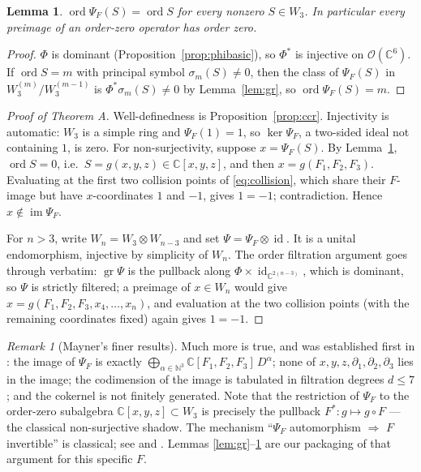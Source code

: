 \documentclass[11pt]{amsart}
\newcommand{\CC}{\mathbb{C}}
\newcommand{\W}{W}
\newcommand{\im}{\operatorname{im}}
\newcommand{\ord}{\operatorname{ord}}
\newcommand{\gr}{\operatorname{gr}}
\newcommand{\id}{\operatorname{id}}
\theoremstyle{plain}
\newtheorem{lemma}[theorem]{Lemma}
\theoremstyle{definition}
\theoremstyle{remark}
\newtheorem{remark}[theorem]{Remark}
\begin{document}
\begin{lemma}\label{lem:strict}
$\ord\Psi_{F}(S)=\ord S$ for every nonzero $S\in\W_{3}$. In particular
every preimage of an order-zero operator has order zero.
\end{lemma}

\begin{proof}
$\Phi$ is dominant (Proposition~\ref{prop:phibasic}), so
$\Phi^{*}$ is injective on $\mathcal{O}(\CC^{6})$. If $\ord S=m$ with
principal symbol $\sigma_{m}(S)\neq0$, then the class of $\Psi_{F}(S)$ in
$\W_{3}^{(m)}/\W_{3}^{(m-1)}$ is
$\Phi^{*}\sigma_{m}(S)\neq0$ by Lemma~\ref{lem:gr}, so
$\ord\Psi_{F}(S)=m$.
\end{proof}

\begin{proof}[Proof of Theorem A]
Well-definedness is Proposition~\ref{prop:ccr}. Injectivity is automatic:
$\W_{3}$ is a simple ring and $\Psi_{F}(1)=1$, so $\ker\Psi_{F}$, a
two-sided ideal not containing $1$, is zero. For non-surjectivity, suppose
$x=\Psi_{F}(S)$. By Lemma~\ref{lem:strict}, $\ord S=0$, i.e.\
$S=g(x,y,z)\in\CC[x,y,z]$, and then $x=g(F_{1},F_{2},F_{3})$. Evaluating
at the first two collision points of \eqref{eq:collision}, which share
their $F$-image but have $x$-coordinates $1$ and $-1$, gives $1=-1$;
contradiction. Hence $x\notin\im\Psi_{F}$.

For $n>3$, write $\W_{n}=\W_{3}\otimes\W_{n-3}$ and set
$\Psi=\Psi_{F}\otimes\id$. It is a unital endomorphism, injective by
simplicity of $\W_{n}$. The order filtration argument goes through
verbatim: $\gr\Psi$ is the pullback along $\Phi\times\id_{\CC^{2(n-3)}}$,
which is dominant, so $\Psi$ is strictly filtered; a preimage of
$x\in\W_{n}$ would give $x=g(F_{1},F_{2},F_{3},x_{4},\dots,x_{n})$, and
evaluation at the two collision points (with the remaining coordinates
fixed) again gives $1=-1$.
\end{proof}

\begin{remark}[Mayner's finer results]\label{rem:mayner}
Much more is true, and was established first in \cite{Mayner26}: the image
of $\Psi_{F}$ is exactly
$\bigoplus_{\alpha\in\mathbb{N}^{3}}\CC[F_{1},F_{2},F_{3}]\,D^{\alpha}$;
none of $x,y,z,\partial_{1},\partial_{2},\partial_{3}$ lies in the image;
the codimension of the image is tabulated in filtration degrees $d\le7$;
and the cokernel is not finitely generated. Note that the restriction of
$\Psi_{F}$ to the order-zero subalgebra
$\CC[x,y,z]\subset\W_{3}$ is precisely the pullback
$F^{*}\colon g\mapsto g\circ F$ --- the classical non-surjective shadow.
The mechanism ``$\Psi_{F}$ automorphism $\Rightarrow$ $F$ invertible'' is
classical; see \cite{vdE00} and \cite[p.~2]{BKK07}. Lemmas
\ref{lem:gr}--\ref{lem:strict} are our packaging of that argument for this
specific $F$.
\end{remark}
\end{document}
